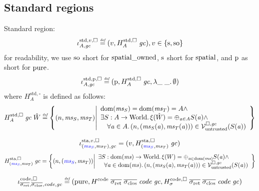 \documentclass[a4paper]{article}
\begin{document}
\subsection{Standard regions}
\label{sec:standard-regions}
Standard region:
\[
  \stdreg{A,\gc}{v} \defeq (v,H_A^{\mathrm{std},\square} \; \gc) , v \in \{\spa,\spao\}
\]
for readability, we use $\spao$ short for $\spatialo$, $\spa$ short for $\spatial$, and $\pur$ as short for $\pure$.
\[
  \stdreg{A,\gc}{\pur} \defeq (\pur,H_A^{\mathrm{std},\square} \; \gc, \lambda \_ \; \_ \ldotp \emptyset)
\]
where $H^{\mathrm{std},\square}_A$ is defined as follows:
\[
  H_A^{\mathrm{std},\square} \; \gc \; \hat{W} \defeq \left\{ \npair{\ms_S,\ms_T} \middle|
    \begin{array}{l}
      \dom(\ms_S) = \dom(\ms_T) = A \wedge \\
      \exists S : A \fun \World \ldotp \xi(\hat{W}) = \oplus_{\aaddr \in A} S(\aaddr) \wedge\\
      \quad \forall \aaddr \in A \ldotp \npair{(\ms_S(\aaddr),\ms_T(\aaddr))} \in \lrv(S(\aaddr))
    \end{array}
  \right\}
\]

\[
  \stareg[\stpair{\ms}{\ms},\gc]{v,\square} = (v,H^\mathrm{sta,\square}_{\stpair{\ms}{\ms}} \; \gc)
\]
\[
  H^\mathrm{sta,\square}_{\stpair{\ms}{\ms}} \; \gc = \left\{ \npair{\stpair{\ms}{\ms}} \middle| 
    \begin{array}{l}
      \exists S : \dom(\ms) \fun \World \ldotp \xi(W) = \oplus_{\aaddr \in \dom(\ms)} S(\aaddr) \wedge\\
      \quad \forall \aaddr \in \dom(\ms) \ldotp \npair{(\ms_S(\aaddr),\ms_T(\aaddr))} \in \lrv(S(\aaddr))
    \end{array}
\right\}
\]


\[
  \codereg{\sigrets,\sigcloss,\code,\gc} \defeq (\pure,
H^\mathrm{code} \; \sigrets \; \sigcloss \; \code \; \gc,
H^\mathrm{code,\square}_\sigma \; \sigrets \; \sigcloss \; \code \; \gc)
\]
\end{document}
